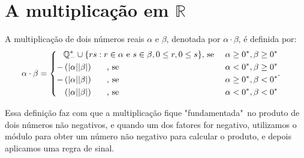 \documentclass[../main.tex]{subfiles}
\begin{document}
\section{A multiplicação em $\mathbb{R}$}
\begin{defi}\label{reais-def-produto}
    A multiplicação de dois números reais $\alpha$ e $\beta$, denotada por $\alpha \cdot \beta$, é definida por:
    \begin{equation*}
         \alpha \cdot \beta = 
        \begin{cases}
        \begin{aligned}
            & \mathbb{Q}^*_{-} \cup \{ rs : r \in \alpha \text{ e } s \in \beta, 0 \leq r, 0 \leq s \} \text{, se } & \alpha \geq 0^*, \beta \geq 0^*  \\
            - & \left(\abs{\alpha}\abs{\beta}\right) \hspace{0.6cm} \text{, se } & \alpha < 0^*, \beta \geq 0^* \\
            - & \left(\abs{\alpha}\abs{\beta}\right) \hspace{0.6cm} \text{, se } & \alpha \geq 0^*, \beta < 0^* \\
              & \left(\abs{\alpha}\abs{\beta}\right) \hspace{0.6cm} \text{, se } & \alpha < 0^*, \beta < 0^*
        \end{aligned}.
        \end{cases}
    \end{equation*}
\end{defi}
Essa definição faz com que a multiplicação fique "fundamentada"\ no produto de dois números não negativos, e quando um dos fatores for negativo, utilizamos o módulo para obter um número não negativo para calcular o produto, e depois aplicamos uma regra de sinal.
\end{document}
